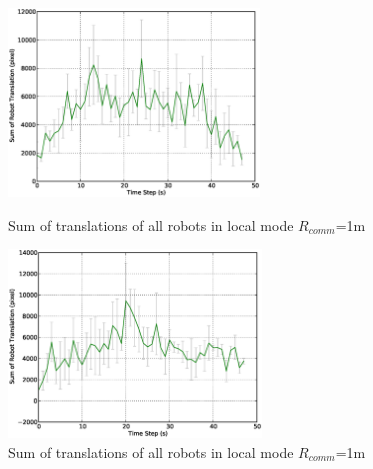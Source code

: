 \documentclass[letterpaper, 10 pt, conference]{ieeeconf}  %
\begin{document}
\begin{figure}
\begin{minipage}[t]{0.5\linewidth}
\centering
\includegraphics[height=5cm, angle=0]
{images/local-500cm/DeltaTranslationStat.eps}
\caption{\small Sum of translations of all robots in local mode $R_{comm}$=1m }
\label{fig:sensitization-stat} %
\end{minipage}
\hspace{0.5cm}
\begin{minipage}[t]{0.5\linewidth}
\centering
\includegraphics[height=5cm, angle=0]{images/local-1m/DeltaTranslationStat.eps}
\caption{\small Sum of translations of all robots in local mode $R_{comm}$=1m }
\label{fig:translation-stat} %
\end{minipage}
\end{figure}
\end{document}
